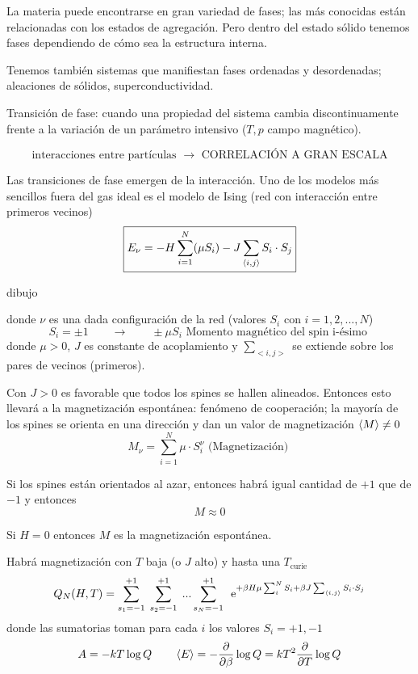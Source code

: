 \documentclass[10pt,oneside]{CBFT_book}
\begin{document}
La materia puede encontrarse en gran variedad de fases; las más conocidas están relacionadas con los estados de 
agregación. Pero dentro del estado sólido tenemos fases dependiendo de cómo sea la estructura interna.

Tenemos también sistemas que manifiestan fases ordenadas y desordenadas; aleaciones de sólidos, superconductividad.

Transición de fase: cuando una propiedad del sistema cambia discontinuamente frente a la variación de un parámetro 
intensivo ($T, p$ campo magnético).

\[
	\text{ interacciones entre partículas } \; \longrightarrow \; \text{ CORRELACIÓN A GRAN ESCALA }  
\]

Las transiciones de fase emergen de la interacción. Uno de los modelos más sencillos fuera del gas ideal es el modelo de
Ising (red con interacción entre primeros vecinos)
\[
	\boxed{ E_\nu = -H \sum_{i=1}^N (\mu S_i) - J \sum_{\braket{i,j}} S_i \cdot S_j }
	\label{energia_ising}
\]

dibujo 


donde $\nu$ es una dada configuración de la red (valores $S_i$ con $i=1,2,...,N$)
\[
	S_i = \pm 1 \qquad \rightarrow \qquad \pm \mu S_i \text{ Momento magnético del spin i-ésimo }
\]
donde $\mu>0$, $J$ es constante de acoplamiento y $\sum_{<i,j>}$ se extiende sobre los pares de vecinos (primeros).

Con $J>0$ es favorable que todos los spines se hallen alineados. Entonces esto llevará a la magnetización espontánea: 
fenómeno de cooperación; la mayoría de los spines se orienta en una dirección y dan un valor de magnetización 
$\braket{M} \neq 0$
\[
	M_\nu = \sum_{i=1}^N \mu \cdot S_i^\nu
	\text{ (Magnetización) }
\]

Si los spines están orientados al azar, entonces habrá igual cantidad de $+1$ que de $-1$ y entonces
\[
	M \approx 0
\]

Si $H=0$ entonces $M$ es la magnetización espontánea.

Habrá magnetización con $T$ baja (o $J$ alto) y hasta una $T_\text{curie}$
\[
	Q_N(H,T) = \sum_{s_1=-1}^{+1} \; \sum_{s_2=-1}^{+1} \; ... \sum_{s_N=-1}^{+1} \;
	\:\mathrm{e}^{ +\beta H \mu \sum_i^N S_i + \beta J \sum_{\braket{i,j}} S_i \cdot S_j }
\]
donde las sumatorias toman para cada $i$ los valores $S_i = +1, -1$
\[
	A = -kT\log Q \qquad \braket{E} = -\frac{\partial^{\hspace{-0.05em}} {}}{\partial {\beta}^{\hspace{-0.05em}}}\log Q = kT^2 \frac{\partial^{\hspace{-0.05em}} {}}{\partial {T}^{\hspace{-0.05em}}} \log Q
\]
\end{document}
